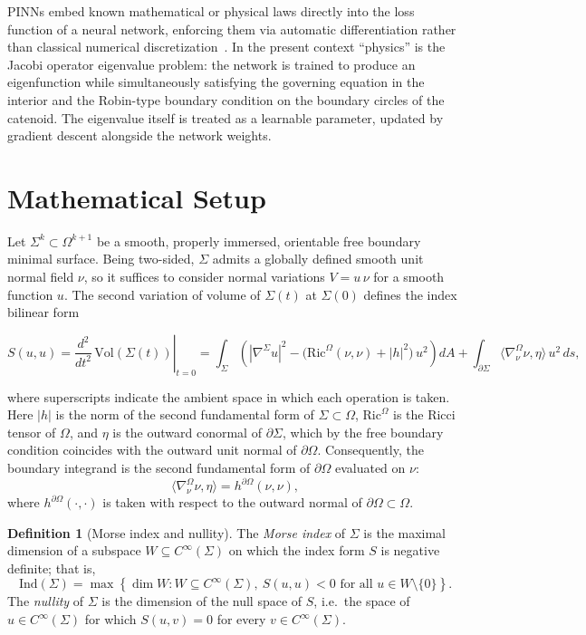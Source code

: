 \documentclass[11pt]{article}
\theoremstyle{definition}
\newtheorem{definition}{Definition}[section]
\theoremstyle{plain}
\begin{document}
PINNs embed known mathematical or physical laws directly into the loss function of a neural network, enforcing them via automatic differentiation rather than classical numerical discretization~\cite{raissi01}. In the present context ``physics'' is the Jacobi operator eigenvalue problem: the network is trained to produce an eigenfunction while simultaneously satisfying the governing equation in the interior and the Robin-type boundary condition on the boundary circles of the catenoid. The eigenvalue itself is treated as a learnable parameter, updated by gradient descent alongside the network weights.


\section{Mathematical Setup}

Let $\Sigma^k \subset \Omega^{k+1}$ be a smooth, properly immersed, orientable free boundary minimal surface. Being two-sided, $\Sigma$ admits a globally defined smooth unit normal field $\nu$, so it suffices to consider normal variations $V = u\,\nu$ for a smooth function $u$. The second variation of volume of $\Sigma(t)$ at $\Sigma(0)$ defines the index bilinear form~\cite{maximo01}

\begin{equation}
	S(u,u) = \left.\dfrac{d^2}{dt^2}\,\mathrm{Vol}(\Sigma(t))\right|_{t=0} = \int_\Sigma \left( |\nabla^\Sigma u|^2 - \big(\mathrm{Ric}^\Omega(\nu, \nu) + |h|^2\big)\,u^2 \right) dA + \int_{\partial \Sigma} \langle \nabla_\nu^\Omega \nu, \eta\rangle\, u^2 \, ds,
\end{equation}

where superscripts indicate the ambient space in which each operation is taken. Here $|h|$ is the norm of the second fundamental form of $\Sigma \subset \Omega$, $\mathrm{Ric}^\Omega$ is the Ricci tensor of $\Omega$, and $\eta$ is the outward conormal of $\partial\Sigma$, which by the free boundary condition coincides with the outward unit normal of $\partial\Omega$. Consequently, the boundary integrand is the second fundamental form of $\partial\Omega$ evaluated on $\nu$:
\begin{equation}
	\langle \nabla_\nu^\Omega \nu, \eta \rangle = h^{\partial \Omega}(\nu, \nu),
\end{equation}
where $h^{\partial\Omega}(\cdot,\cdot)$ is taken with respect to the outward normal of $\partial\Omega \subset \Omega$.

\begin{definition}[Morse index and nullity]\label{def:index}
	The \emph{Morse index} of $\Sigma$ is the maximal dimension of a subspace $W \subseteq C^\infty(\Sigma)$ on which the index form $S$ is negative definite; that is,
	\begin{equation}
		\mathrm{Ind}(\Sigma) = \max\left\{ \dim W : W \subseteq C^\infty(\Sigma),\ S(u,u) < 0 \text{ for all } u \in W \setminus \{0\} \right\}.
	\end{equation}
	The \emph{nullity} of $\Sigma$ is the dimension of the null space of $S$, i.e.\ the space of $u \in C^\infty(\Sigma)$ for which $S(u,v) = 0$ for every $v \in C^\infty(\Sigma)$.
\end{definition}
\end{document}
